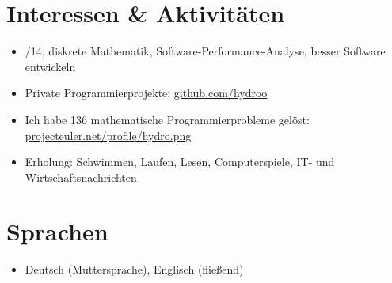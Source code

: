 \vspace{0.66cm} %

\customhrule
\section*{Interessen \& Aktivit\"aten}
\begin{itemize}
	\item {}/14, diskrete Mathematik, Software-Performance-Analyse, besser Software entwickeln
	\item Private Programmierprojekte: \href{https://github.com/hydroo}{github.com/hydroo}
	\item Ich habe 136 mathematische Programmierprobleme gel\"ost: \href{http://projecteuler.net/profile/hydro.png}{projecteuler.net/profile/hydro.png}
	\item Erholung: Schwimmen, Laufen, Lesen, Computerspiele, IT- und Wirtschaftsnachrichten
\end{itemize}

\customhrule
\section*{Sprachen}
\begin{itemize}
	\item Deutsch (Muttersprache), Englisch (flie\ss end)
\end{itemize}


